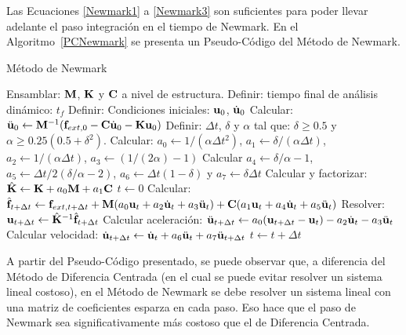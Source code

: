 Las Ecuaciones \eqref{Newmark1} a \eqref{Newmark3} son suficientes para poder llevar adelante el paso integración en el tiempo de Newmark. %
%
En el Algoritmo~\ref{PCNewmark} se presenta un Pseudo-Código del Método de Newmark.

\begin{algorithm}
	
	\caption{Método de Newmark}
	\label{PCNewmark}
	
	\begin{algorithmic}[1]
		
		\STATE Ensamblar: ${\bf M}$, ${\bf K}$ y ${\bf C}$ a nivel de estructura.
		\STATE Definir: tiempo final de análisis dinámico: $t_f$
		\STATE Definir: Condiciones iniciales: ${\bf u}_{0}$, $\dot{{\bf u}}_{0}$
		\STATE Calcular: $\ddot{{\bf u}}_{0}\leftarrow {\bf M}^{-1}({\bf f}_{ext,0} - {\bf C} \dot{{\bf u}}_0 - {\bf K} {\bf u}_0)$
		\STATE Definir: $\Delta t$, $\delta$ y $\alpha$ tal que: $\delta \geq 0.5$ y $\alpha \geq 0.25(0.5+\delta^2)$.
		\STATE Calcular: $a_0\leftarrow1/(\alpha\Delta t^2)$, $a_1\leftarrow\delta/(\alpha\Delta t)$, $a_2\leftarrow1/(\alpha\Delta t)$, $a_3\leftarrow \left( 1/(2\alpha) - 1 \right)$
		\STATE Calcular $a_4\leftarrow\delta/\alpha-1$, $a_5\leftarrow \Delta t/2(\delta/\alpha-2)$, $a_6\leftarrow\Delta t(1-\delta)$ y $a_7\leftarrow \delta \Delta t$
		\STATE Calcular y factorizar: $\hat{{\bf K}}\leftarrow {\bf K} + a_0{\bf M}+a_1{\bf C}$
		\STATE $t \leftarrow 0$
		\STATE Calcular: $\hat{{\bf f}}_{t+\Delta t}\leftarrow {\bf f}_{ext,t+\Delta t} +{\bf M} (a_0{\bf u}_t+a_2\dot{{\bf u}}_t+a_3\ddot{{\bf u}}_t)+{\bf C} (a_1{\bf u}_t+a_4\dot{{\bf u}}_t+a_5\ddot{{\bf u}}_t)$
		\STATE Resolver: ${\bf u}_{t+\Delta t}\leftarrow \hat{{\bf K}}^{-1}\hat{{\bf f}}_{t+\Delta t}$
		\STATE Calcular aceleración: $\ddot{{\bf u}}_{t+\Delta t}\leftarrow a_0({\bf u}_{t+\Delta t}-{\bf u}_{t})-a_2\dot{{\bf u}}_{t}-a_3\ddot{{\bf u}}_{t}$
		\STATE Calcular velocidad: $\dot{{\bf u}}_{t+\Delta t}\leftarrow \dot{{\bf u}}_{t} + a_6\ddot{{\bf u}}_{t}+ a_7\ddot{{\bf u}}_{t+\Delta t}$
		\STATE $t\leftarrow t+\Delta t$
		\ENDWHILE
		
	\end{algorithmic}
	
\end{algorithm}

A partir del Pseudo-Código presentado, se puede observar que, a diferencia del Método de Diferencia Centrada (en el cual se puede evitar resolver un sistema lineal costoso), en el Método de Newmark se debe resolver un sistema lineal con una matriz de coeficientes esparza en cada paso. %
%
Eso hace que el paso de Newmark sea significativamente más costoso que el de Diferencia Centrada.


